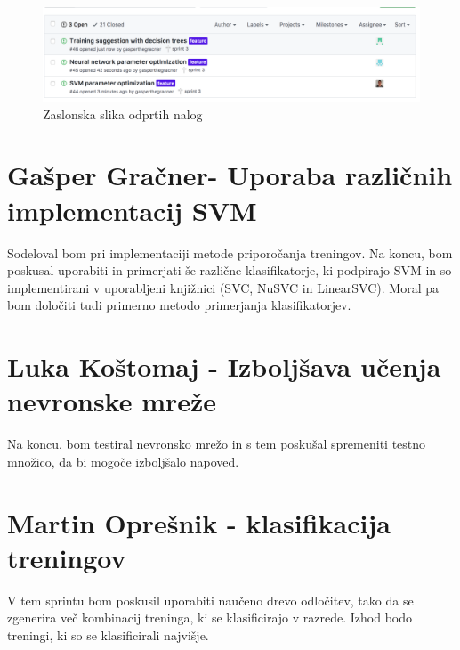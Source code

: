 \documentclass[a4paper,11pt]{article}
\begin{document}
\begin{figure}[h]
\caption{Zaslonska slika odprtih nalog}
\centering
\includegraphics[width=1\textwidth]{issues}
\end{figure}

\newpage
\section{Gašper Gračner- Uporaba različnih implementacij SVM}
Sodeloval bom pri implementaciji metode priporočanja treningov.
Na koncu, bom poskusal uporabiti in primerjati še različne klasifikatorje, ki podpirajo SVM
in so implementirani v uporabljeni knjižnici (SVC, NuSVC in LinearSVC). Moral pa bom
določiti tudi primerno metodo primerjanja klasifikatorjev. 

\section{Luka Koštomaj - Izboljšava učenja nevronske mreže}

Na koncu, bom testiral nevronsko mrežo in s tem poskušal spremeniti testno množico, da bi mogoče izboljšalo napoved.

\section{Martin Oprešnik - klasifikacija treningov }

V tem sprintu bom poskusil uporabiti naučeno drevo odločitev, tako da se zgenerira več kombinacij treninga, ki se klasificirajo v razrede. Izhod bodo treningi, ki so se klasificirali najvišje.
\end{document}
